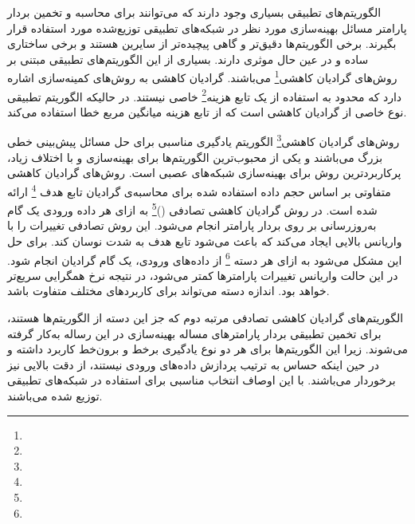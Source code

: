 الگوریتم‌های تطبیقی بسیاری وجود دارند که می‌توانند برای محاسبه و تخمین بردار پارامتر مسائل بهینه‌سازی مورد نظر در شبکه‌های تطبیقی توزیع‌شده مورد استفاده قرار بگیرند. برخی الگوریتم‌ها دقیق‌تر و گاهی پیچیده‌تر از سایرین هستند و برخی ساختاری ساده و در عین حال موثری دارند. بسیاری از این الگوریتم‌های تطبیقی مبتنی بر روش‌های گرادیان کاهشی\footnote{} می‌باشند. گرادیان کاهشی به روش‌های کمینه‌سازی اشاره دارد که محدود به استفاده از یک تابع هزینه\footnote{}  خاصی نیستند. در حالیکه الگوریتم تطبیقی  نوع خاصی از گرادیان کاهشی است که از تابع هزینه میانگین مربع خطا استفاده می‌کند. 

روش‌های گرادیان کاهشی\footnote{} الگوریتم‌ یادگیری مناسبی برای حل مسائل پیش‌بینی خطی بزرگ می‌باشند و یکی از محبوب‌ترین الگوریتم‌ها برای بهینه‌سازی و با اختلاف زیاد، پرکاربردترین روش برای بهینه‌سازی شبکه‌های عصبی است\cite{Bo2010}. روش‌های گرادیان کاهشی متفاوتی بر اساس حجم داده‌ استفاده شده برای محاسبه‌ی گرادیان تابع هدف \footnote{} ارائه شده است. در روش گرادیان کاهشی تصادفی ()\footnote{} به ازای هر داده ورودی یک گام به‌روزرسانی بر روی بردار پارامتر انجام می‌شود. این روش تصادفی تغییرات را با واریانس بالایی ایجاد می‌کند که باعث می‌شود تابع هدف به شدت نوسان کند. برای حل این مشکل می‌شود به ازای هر دسته \footnote{} از داده‌های ورودی، یک گام گرادیان انجام شود. در این حالت واریانس تغییرات پارامترها کمتر می‌شود، در نتیجه نرخ همگرایی سریع‌تر خواهد بود. اندازه دسته می‌تواند برای کاربردهای مختلف متفاوت باشد\cite{We2018}.  

الگوریتم‌های گرادیان کاهشی تصادفی مرتبه دوم که جز این دسته از الگوریتم‌ها هستند، برای تخمین تطبیقی بردار پارامترهای مساله بهینه‌سازی در این رساله به‌کار گرفته می‌شوند. زیرا این الگوریتم‌ها برای هر دو نوع یادگیری برخط و برون‌خط کاربرد داشته و در حین اینکه حساس به ترتیب پردازش داد‌ه‌های ورودی نیستند، از دقت بالایی نیز برخوردار می‌باشند. با این اوصاف انتخاب مناسبی برای استفاده در شبکه‌های تطبیقی توزیع شده می‌باشند.

